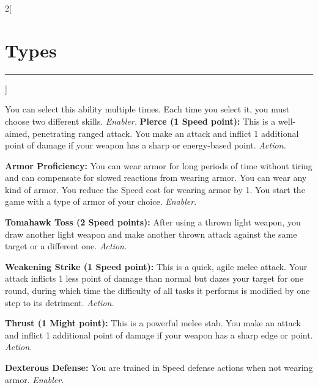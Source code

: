\documentclass[a4paper,10pt,final]{book}
\newcommand{\HRule}{\rule{\linewidth}{0.5mm}} %
\newcommand{\newSection}[1]{\section*{#1} \addcontentsline{toc}{section}{#1} \label{sec:#1} \HRule}
\newcommand{\itemAbility}[2]{\textcolor{25gray}{\textbullet\textbf{ #1:}} {#2}\par}
\newcommand{\enabler}{\textit{ Enabler.}}
\newcommand{\action}{\textit{ Action.}}
\newenvironment{docsection}[1]
{
  \begin{multicols*}{2}[\newSection{#1}]
}
{
  \end{multicols*}
  \newpage
}
\begin{document}
\begin{docsection}{Types}
{You can select this ability multiple times.
Each time you select it, you must choose
two different skills.\enabler} 
\itemAbility{Pierce (1 Speed point)}{This is a well-aimed,
penetrating ranged attack. You make
an attack and inflict 1 additional point of
damage if your weapon has a sharp or energy-based point.\action}
\itemAbility{Armor Proficiency}{You can wear armor
for long periods of time without tiring
and can compensate for slowed reactions
from wearing armor. You can wear any kind
of armor. You reduce the Speed cost for
wearing armor by 1. You start the game with
a type of armor of your choice.\enabler}
\itemAbility{Tomahawk Toss (2 Speed points)}{After using
a thrown light weapon, you draw another
light weapon and make another thrown
attack against the same target or a different
one.\action}
\itemAbility{Weakening Strike (1 Speed point)}{This is a quick,
agile melee attack. Your attack inflicts 1 less
point of damage than normal but dazes
your target for one round, during which
time the difficulty of all tasks it performs
is modified by one step to its detriment.\action}
\itemAbility{Thrust (1 Might point)}{This is a powerful
melee stab. You make an attack and inflict 1
additional point of damage if your weapon
has a sharp edge or point.\action}
\itemAbility{Dexterous Defense}{You are trained
in Speed defense actions when not wearing
armor.\enabler}


\end{docsection}
\end{document}
